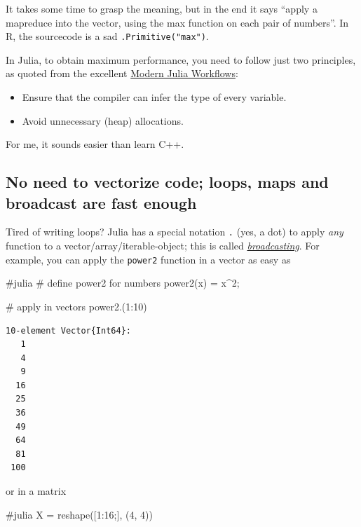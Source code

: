 \documentclass[
  letterpaper,
  DIV=11,
  numbers=noendperiod]{scrartcl}
\newenvironment{Shaded}{\begin{snugshade}}{\end{snugshade}}
\newcommand{\CommentTok}[1]{\textcolor[rgb]{0.37,0.37,0.37}{#1}}
\newcommand{\FloatTok}[1]{\textcolor[rgb]{0.68,0.00,0.00}{#1}}
\newcommand{\FunctionTok}[1]{\textcolor[rgb]{0.28,0.35,0.67}{#1}}
\newcommand{\NormalTok}[1]{\textcolor[rgb]{0.00,0.23,0.31}{#1}}
\newcommand{\OperatorTok}[1]{\textcolor[rgb]{0.37,0.37,0.37}{#1}}
\providecommand{\tightlist}{%
  \setlength{\itemsep}{0pt}\setlength{\parskip}{0pt}}\usepackage{longtable,booktabs,array}
\begin{document}
It takes some time to grasp the meaning, but in the end it says ``apply
a mapreduce into the vector, using the max function on each pair of
numbers''. In R, the sourcecode is a sad \texttt{.Primitive("max")}.

In Julia, to obtain maximum performance, you need to follow just two
principles, as quoted from the excellent
\href{https://modernjuliaworkflows.org/optimizing/}{Modern Julia
Workflows}:

\begin{itemize}
\tightlist
\item
  Ensure that the compiler can infer the type of every variable.
\item
  Avoid unnecessary (heap) allocations.
\end{itemize}

For me, it sounds easier than learn C++.

\subsection{No need to vectorize code; loops, maps and broadcast are
fast
enough}\label{no-need-to-vectorize-code-loops-maps-and-broadcast-are-fast-enough}

Tired of writing loops? Julia has a special notation \texttt{.} (yes, a
dot) to apply \emph{any} function to a vector/array/iterable-object;
this is called
\href{https://docs.julialang.org/en/v1/manual/arrays/\#Broadcasting}{\emph{broadcasting}}.
For example, you can apply the \texttt{power2} function in a vector as
easy as

\begin{Shaded}
\begin{Highlighting}[]
\CommentTok{\#julia}
\CommentTok{\# define power2 for numbers}
\FunctionTok{power2}\NormalTok{(x) }\OperatorTok{=}\NormalTok{ x}\OperatorTok{\^{}}\FloatTok{2}\NormalTok{;}

\CommentTok{\# apply in vectors}
\FunctionTok{power2}\NormalTok{.(}\FloatTok{1}\OperatorTok{:}\FloatTok{10}\NormalTok{)}
\end{Highlighting}
\end{Shaded}

\begin{verbatim}
10-element Vector{Int64}:
   1
   4
   9
  16
  25
  36
  49
  64
  81
 100
\end{verbatim}

or in a matrix

\begin{Shaded}
\begin{Highlighting}[]
\CommentTok{\#julia}
\NormalTok{X }\OperatorTok{=} \FunctionTok{reshape}\NormalTok{([}\FloatTok{1}\OperatorTok{:}\FloatTok{16}\NormalTok{;], (}\FloatTok{4}\NormalTok{, }\FloatTok{4}\NormalTok{))}
\end{Highlighting}
\end{Shaded}
\end{document}
